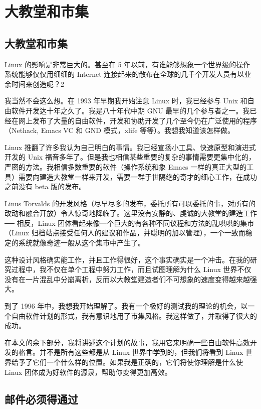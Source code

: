 \section{大教堂和市集}

\subsection{大教堂和市集}

Linux 的影响是非常巨大的。甚至在 5 年以前，有谁能够想象一个世界级的操作系统能够仅仅用细细的 Internet 连接起来的散布在全球的几千个开发人员有以业余时间来创造呢？2


我当然不会这么想。在 1993 年早期我开始注意 Linux 时，我已经参与 Unix 和自由软件开发达十年之久了。我是八十年代中期 GNU 最早的几个参与者之一。我已经在网上发布了大量的自由软件，开发和协助开发了几个至今仍在广泛使用的程序（Nethack, Emacs VC 和 GND 模式，xlife 等等）。我想我知道该怎样做。

Linux 推翻了许多我认为自己明白的事情。我已经宣扬小工具、快速原型和演进式开发的 Unix 福音多年了。但是我也相信某些重要的复杂的事情需要更集中化的，严密的方法。我相信多数重要的软件（操作系统和象 Emacs 一样的真正大型的工具）需要向建造大教堂一样来开发，需要一群于世隔绝的奇才的细心工作，在成功之前没有 beta 版的发布。

Linus Torvalds 的开发风格（尽早尽多的发布，委托所有可以委托的事，对所有的改动和融合开放）令人惊奇地降临了。这里没有安静的、虔诚的大教堂的建造工作 ── 相反，Linux 团体看起来像一个巨大的有各种不同议程和方法的乱哄哄的集市（Linux 归档站点接受任何人的建议和作品，并聪明的加以管理），一个一致而稳定的系统就像奇迹一般从这个集市中产生了。

这种设计风格确实能工作，并且工作得很好，这个事实确实是一个冲击。在我的研究过程中，我不仅在单个工程中努力工作，而且试图理解为什么 Linux 世界不仅没有在一片混乱中分崩离析，反而以大教堂建造者们不可想象的速度变得越来越强大。

到了 1996 年中，我想我开始理解了。我有一个极好的测试我的理论的机会，以一个自由软件计划的形式，我有意识地用了市集风格。我这样做了，并取得了很大的成功。

在本文的余下部分，我将讲述这个计划的故事，我用它来明确一些自由软件高效开发的格言。并不是所有这些都是从 Linux 世界中学到的，但我们将看到 Linux 世界给予了它们一个什么样的位置。如果我是正确的，它们将使你理解是什么使 Linux 团体成为好软件的源泉，帮助你变得更加高效。


\subsection{邮件必须得通过}

